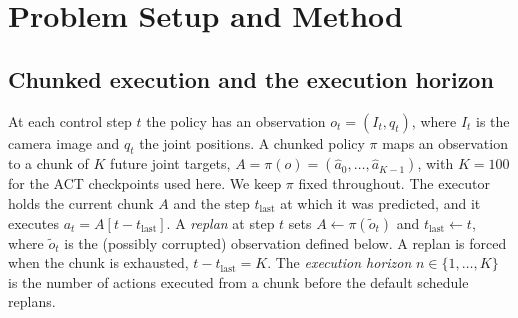 \documentclass[11pt]{article}
\begin{document}
\section{Problem Setup and Method}
\label{sec:method}

\subsection{Chunked execution and the execution horizon}
At each control step $t$ the policy has an observation $o_t=(I_t,q_t)$, where $I_t$ is the camera image and $q_t$ the joint positions. A chunked policy $\pi$ maps an observation to a chunk of $K$ future joint targets, $A=\pi(o)=(\hat a_0,\dots,\hat a_{K-1})$, with $K{=}100$ for the ACT checkpoints used here. We keep $\pi$ fixed throughout. The executor holds the current chunk $A$ and the step $t_{\mathrm{last}}$ at which it was predicted, and it executes $a_t=A[t-t_{\mathrm{last}}]$. A \emph{replan} at step $t$ sets $A\leftarrow\pi(\tilde o_t)$ and $t_{\mathrm{last}}\leftarrow t$, where $\tilde o_t$ is the (possibly corrupted) observation defined below. A replan is forced when the chunk is exhausted, $t-t_{\mathrm{last}}=K$. The \emph{execution horizon} $n\in\{1,\dots,K\}$ is the number of actions executed from a chunk before the default schedule replans.
\end{document}

